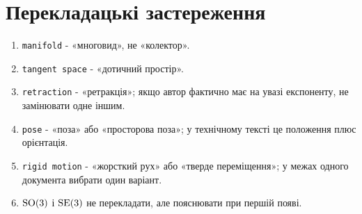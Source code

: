 \section{Перекладацькі застереження}

\begin{enumerate}[label=\arabic*.]
  \item \texttt{manifold} - «многовид», не «колектор».
  \item \texttt{tangent space} - «дотичний простір».
  \item \texttt{retraction} - «ретракція»; якщо автор фактично має на увазі експоненту, не замінювати одне іншим.
  \item \texttt{pose} - «поза» або «просторова поза»; у технічному тексті це положення плюс орієнтація.
  \item \texttt{rigid motion} - «жорсткий рух» або «тверде переміщення»; у межах одного документа вибрати один варіант.
  \item $\mathrm{SO}(3)$ і $\mathrm{SE}(3)$ не перекладати, але пояснювати при першій появі.
\end{enumerate}

